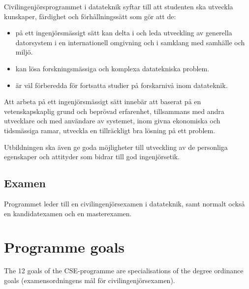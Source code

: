\documentclass[twocolumn]{article}
\begin{document}
Civilingenjörsprogrammet i datateknik syftar till att studenten ska
utveckla kunskaper, färdighet och förhållningssätt som gör att de:
\begin{itemize}
\item på ett ingenjörsmässigt sätt kan delta i och leda utveckling av
  generella datorsystem i en internationell omgivning och i samklang
  med samhälle och miljö.
\item kan lösa forskningsmässiga och komplexa datatekniska problem.
\item är väl förberedda för fortsatta studier på forskarnivå inom
  datateknik.
\end{itemize}
Att arbeta på ett ingenjörsmässigt sätt innebär att
baserat på en vetenskapskaplig grund och beprövad erfarenhet,
tillsammans med andra utvecklare och med användare av systemet,
inom givna ekonomiska och tidsmässiga ramar,
utveckla en tillräckligt bra lösning på ett problem.

Utbildningen ska även ge goda möjligheter till utveckling av de
personliga egenskaper och attityder som bidrar till god ingenjörsetik.

\subsection{Examen}

Programmet leder till en civilingenjörsexamen i datateknik, samt
normalt också en kandidat\-examen och en masterexamen.

\section{Programme goals}

The 12 goals of the CSE-programme are specialisations of the degree
ordinance goals (examens\-ordningens mål för civilingenjörsexamen).
\end{document}
